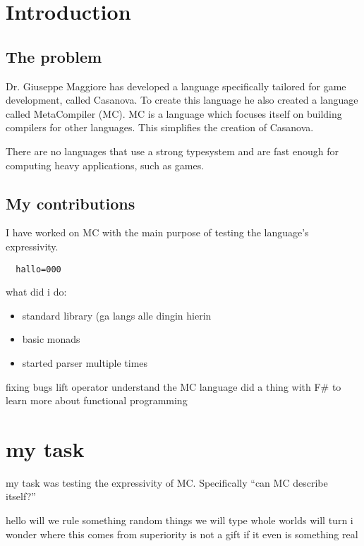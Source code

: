 \chapter{Introduction}
\section{The problem}
Dr. Giuseppe Maggiore has developed a language specifically tailored for game development, called Casanova. To create this language he also created a language called MetaCompiler (MC). MC is a language which focuses itself on building compilers for other languages. This simplifies the creation of Casanova.

There are no languages that use a strong typesystem and are fast enough for computing heavy applications, such as games.

\section{My contributions}
I have worked on MC with the main purpose of testing the language's expressivity.
\begin{lstlisting}
  hallo=000
  \end{lstlisting}


what did i do:
\begin{itemize}
\item standard library (ga langs alle dingin hierin
\item basic monads
\item started parser multiple times
\end{itemize}


fixing bugs
lift operator
understand the MC language
did a thing with F\# to learn more about functional programming


\chapter{my task}
my task was testing the expressivity of MC. Specifically ``can MC describe itself?''


hello will we rule something 
random things we will type
whole worlds will turn
i wonder where this comes from
superiority is not a gift
if it even is something real

